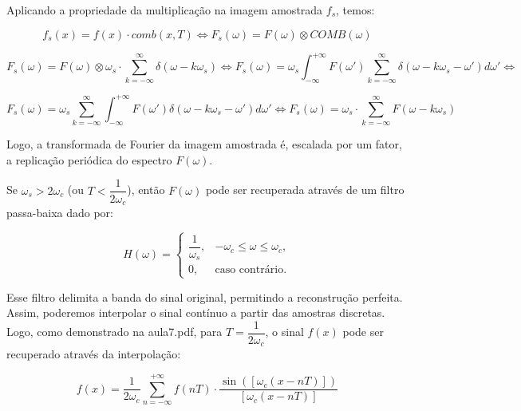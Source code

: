 \documentclass[]{abntex2}
\begin{document}
Aplicando a propriedade da multiplicação na imagem amostrada \( f_s \), temos:

\begin{equation*}
    f_s(x) = f(x) \cdot comb(x, T) \Leftrightarrow F_s(\omega) = F(\omega) \otimes COMB(\omega)
\end{equation*}

\begin{equation*}
    F_s(\omega) = F(\omega) \otimes \omega_{s} \cdot \sum_{k=- \infty}^{\infty} \delta (\omega - k\omega_{s}) \Leftrightarrow F_s(\omega) = \omega_s \int_{-\infty}^{+\infty} F(\omega') \sum_{k=- \infty}^{\infty} \delta (\omega - k\omega_{s} - \omega') d\omega' \Leftrightarrow
\end{equation*}

\begin{equation*}
	F_s(\omega) = \omega_s \sum_{k=- \infty}^{\infty} \int_{-\infty}^{+\infty} F(\omega')  \delta (\omega - k\omega_{s} - \omega') d\omega' \Leftrightarrow F_s(\omega) = \omega_{s} \cdot \sum_{k=- \infty}^{\infty} F(\omega - k\omega_s)
\end{equation*}

Logo, a transformada de Fourier da imagem amostrada é, escalada por um fator, a replicação periódica do espectro \( F(\omega) \).

Se \( \omega_s > 2\omega_c \) (ou \( T < \dfrac{1}{2\omega_c} \)), então \( F(\omega) \) pode ser recuperada através de um filtro passa-baixa dado por:

\begin{equation}
    H(\omega) =
    \begin{cases}
        \dfrac{1}{\omega_s}, & -\omega_c \leq \omega \leq \omega_c, \\
        0, & \text{caso contrário.}
    \end{cases}
\end{equation}

Esse filtro delimita a banda do sinal original, permitindo a reconstrução perfeita. Assim, poderemos interpolar o sinal contínuo a partir das amostras discretas. Logo, como demonstrado na aula7.pdf, para \( T = \dfrac{1}{2\omega_c} \), o sinal \( f(x) \) pode ser recuperado através da interpolação:

\begin{equation*}
    f(x) = \dfrac{1}{2\omega_c}\sum_{n=-\infty}^{+\infty} f(nT) \cdot \frac{\sin\left( [\omega_c (x-nT)] \right)}{[\omega_c (x-nT)]}
\end{equation*}
\end{document}
